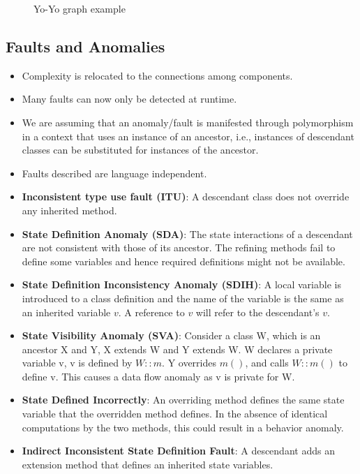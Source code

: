 \documentclass[a4paper]{article}
\begin{document}
\begin{itemize}
\begin{figure}[H]
        \caption{Yo-Yo graph example}
    \end{figure}
\end{itemize}

\subsection{Faults and Anomalies}
\begin{itemize}
    \item Complexity is relocated to the connections among components.
    \item Many faults can now only be detected at runtime.
    \item We are assuming that an anomaly/fault is manifested through polymorphism in a context that uses an instance of an ancestor, i.e., instances of descendant classes can be substituted for instances of the ancestor.
    \item Faults described are language independent.
    \item \textbf{Inconsistent type use fault (ITU)}: A descendant class does not override any inherited method.
    \item \textbf{State Definition Anomaly (SDA)}: The state interactions of a descendant are not consistent with those of its ancestor. The refining methods fail to define some variables and hence required definitions might not be available.
    \item \textbf{State Definition Inconsistency Anomaly (SDIH)}: A local variable is introduced to a class definition and the name of the variable is the same as an inherited variable $v$. A reference to $v$ will refer to the descendant's $v$.
    \item \textbf{State Visibility Anomaly (SVA)}: Consider a class W, which is an ancestor X and Y, X extends W and Y extends W. W declares a private variable v, v is defined by $W::m$. Y overrides $m()$, and calls $W::m()$ to define v. This causes a data flow anomaly as v is private for W.
    \item \textbf{State Defined Incorrectly}: An overriding method defines the same state variable that the overridden method defines. In the absence of identical computations by the two methods, this could result in a behavior anomaly.
    \item \textbf{Indirect Inconsistent State Definition Fault}: A descendant adds an extension method that defines an inherited state variables.
\end{itemize}
\end{document}
